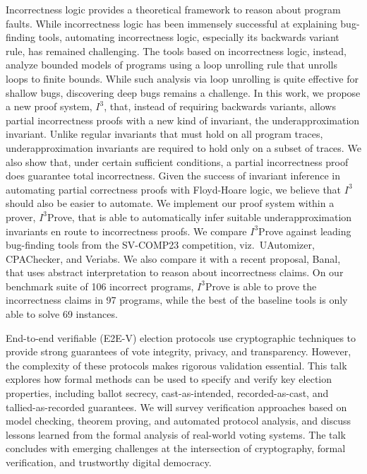 \documentclass[a4paper,UKenglish]{dagrep-v2021}
\begin{document}

Incorrectness logic provides a theoretical framework to reason about program faults. While incorrectness logic has been immensely successful at explaining bug-finding tools, automating incorrectness logic, especially its backwards variant rule, has remained challenging. The tools based on incorrectness logic, instead, analyze bounded models of programs using a loop unrolling rule that unrolls loops to finite bounds. While such analysis via loop unrolling is quite effective for shallow bugs, discovering deep bugs remains a challenge. In this work, we propose a new proof system, $I^3$, that, instead of requiring backwards variants, allows partial incorrectness proofs with a new kind of invariant, the underapproximation invariant. Unlike regular invariants that must hold on all program traces, underapproximation invariants are required to hold only on a subset of traces. We also show that, under certain sufficient conditions, a partial incorrectness proof does guarantee total incorrectness. Given the success of invariant inference in automating partial correctness proofs with Floyd-Hoare logic, we believe that $I^3$ should also be easier to automate. We implement our proof system within a prover, $I^3$Prove, that is able to automatically infer suitable underapproximation invariants en route to incorrectness proofs. We compare $I^3$Prove against leading bug-finding tools from the SV-COMP23 competition, viz.\ UAutomizer, CPAChecker, and Veriabs. We also compare it with a recent proposal, Banal, that uses abstract interpretation to reason about incorrectness claims. On our benchmark suite of 106 incorrect programs, $I^3$Prove is able to prove the incorrectness claims in 97 programs, while the best of the baseline tools is only able to solve 69 instances.


End-to-end verifiable (E2E-V) election protocols use cryptographic techniques to provide strong guarantees of vote integrity, privacy, and transparency. However, the complexity of these protocols makes rigorous validation essential. This talk explores how formal methods can be used to specify and verify key election properties, including ballot secrecy, cast-as-intended, recorded-as-cast, and tallied-as-recorded guarantees. We will survey verification approaches based on model checking, theorem proving, and automated protocol analysis, and discuss lessons learned from the formal analysis of real-world voting systems. The talk concludes with emerging challenges at the intersection of cryptography, formal verification, and trustworthy digital democracy.
\end{document}
